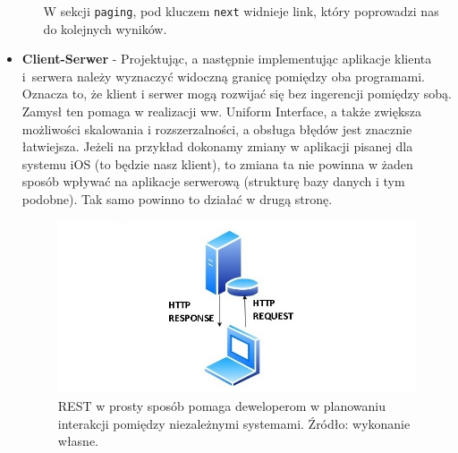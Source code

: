 \documentclass[oneside,polski,logo,indent]{amuthesis}
\begin{document}
\begin{itemize}
\begin{itemize}
W sekcji \texttt{paging}, pod kluczem \texttt{next} widnieje link, który poprowadzi nas do kolejnych wyników.\newline 
\end{itemize}

\item \textbf{Client-Serwer} - Projektując, a następnie implementując aplikacje klienta i~serwera należy wyznaczyć widoczną granicę pomiędzy oba programami. Oznacza to, że klient i serwer mogą rozwijać się bez ingerencji pomiędzy sobą. Zamysł ten pomaga w realizacji ww. Uniform Interface, a także zwiększa możliwości skalowania i rozszerzalności, a obsługa błędów jest znacznie łatwiejsza. Jeżeli na przykład dokonamy zmiany w aplikacji pisanej dla systemu iOS (to będzie nasz klient), to zmiana ta nie powinna w żaden sposób wpływać na aplikacje serwerową (strukturę bazy danych i tym podobne). Tak samo powinno to działać w drugą stronę. 


\begin{figure}[H]
\centering
\includegraphics[width=14cm]{rest.jpg}
\caption{REST w prosty sposób pomaga deweloperom w planowaniu interakcji pomiędzy niezależnymi systemami. Źródło: wykonanie własne.}
\label{REST}
\end{figure}



\end{itemize}
\end{document}
